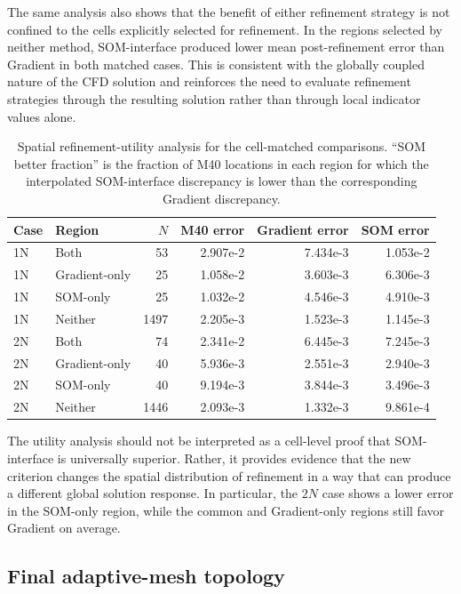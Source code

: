 The same analysis also shows that the benefit of either refinement strategy
is not confined to the cells explicitly selected for refinement. In the
regions selected by neither method, SOM-interface produced lower mean
post-refinement error than Gradient in both matched cases. This is
consistent with the globally coupled nature of the CFD solution and
reinforces the need to evaluate refinement strategies through the resulting
solution rather than through local indicator values alone.

\begin{table}[htbp]
\centering
\caption{Spatial refinement-utility analysis for the cell-matched
comparisons. ``SOM better fraction'' is the fraction of M40 locations in
each region for which the interpolated SOM-interface discrepancy is lower
than the corresponding Gradient discrepancy.}
\label{tab:refinement_utility_interface}
\small
\begin{tabular}{llrrrr}
\toprule
Case & Region & \(N\) & M40 error & Gradient error & SOM error \\
\midrule
1N & Both & 53 & 2.907e-2 & 7.434e-3 & 1.053e-2 \\
1N & Gradient-only & 25 & 1.058e-2 & 3.603e-3 & 6.306e-3 \\
1N & SOM-only & 25 & 1.032e-2 & 4.546e-3 & 4.910e-3 \\
1N & Neither & 1497 & 2.205e-3 & 1.523e-3 & 1.145e-3 \\
\midrule
2N & Both & 74 & 2.341e-2 & 6.445e-3 & 7.245e-3 \\
2N & Gradient-only & 40 & 5.936e-3 & 2.551e-3 & 2.940e-3 \\
2N & SOM-only & 40 & 9.194e-3 & 3.844e-3 & 3.496e-3 \\
2N & Neither & 1446 & 2.093e-3 & 1.332e-3 & 9.861e-4 \\
\bottomrule
\end{tabular}
\end{table}

The utility analysis should not be interpreted as a cell-level proof that
SOM-interface is universally superior. Rather, it provides evidence that
the new criterion changes the spatial distribution of refinement in a way
that can produce a different global solution response. In particular, the
\(2N\) case shows a lower error in the SOM-only region, while the common and
Gradient-only regions still favor Gradient on average.


\subsection{Final adaptive-mesh topology}

